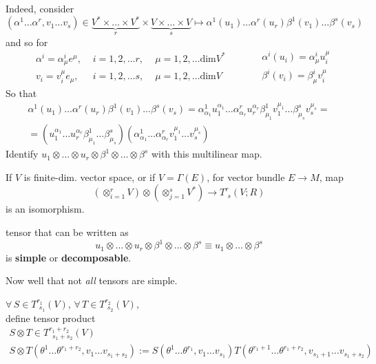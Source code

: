 Indeed, consider 
\[
(\alpha^1 \dots \alpha^r, v_1 \dots v_s) \in \underbrace{V^* \times \dots \times V^* }_{r} \times \underbrace{ V\times \dots \times V}_{s} \mapsto \alpha^1(u_1) \dots \alpha^r(u_r) \beta^1(v_1) \dots \beta^s(v_s)
\]
and so for 
\[
\begin{aligned}
	& \alpha^i = \alpha^i_{\mu} e^{\mu} , \, & \, i =1,2, \dots r, \, & \, \mu = 1,2, \dots \text{dim}V^* \\ 
	& v_i = v_i^{\mu} e_{\mu} , \, & \, i = 1,2, \dots s, \, & \, \mu = 1, 2, \dots \text{dim}V 
\end{aligned} \qquad \, \begin{aligned}
& \alpha^i(u_i) = \alpha^i_{\mu} u^{\mu}_i \\ 
 & \beta^i(v_i) = \beta^i_{\mu} v^{\mu}_i
\end{aligned}
\]
So that 
\[
\begin{gathered}
	\alpha^1(u_1) \dots \alpha^r(u_r) \beta^1(v_1) \dots \beta^s(v_s) = \alpha^1_{\alpha_1}u^{\alpha_1}_1 \dots \alpha^r_{\alpha_r} u^{\alpha_r}_r \beta^1_{\mu_1} v^{\mu_1}_1 \dots \beta^s_{\mu_s} v^{\mu_s}_s = \\
	= (u^{\alpha_1}_1 \dots u_r^{\alpha_r} \beta^1_{\mu_1} \dots \beta^s_{\mu_s})(\alpha^1_{\alpha_1} \dots \alpha^r_{\alpha_r} v_1^{\mu_1} \dots v_s^{\mu_s} )
\end{gathered}
\]
Identify $u_1 \otimes \dots \otimes u_r \otimes \beta^1 \otimes \dots \otimes \beta^s$ with this multilinear map.  

\begin{proposition}
If $V$ is finite-dim. vector space, or if $V=\Gamma(E)$, for vector bundle $E\to M$, map
\begin{equation}
\left( \otimes_{i=1}^r V \right)  \otimes \left( \otimes_{j=1}^s V^* \right) \to T^r_{ \, \, s}(V;R)
\end{equation}
is an isomorphism.  
\end{proposition}

\begin{definition}
tensor that can be written as 
\begin{equation}
u_1\otimes \dots \otimes u_r \otimes \beta^1 \otimes \dots \otimes \beta^s \equiv u_1\otimes \dots \otimes \beta^s 
\end{equation}
is \textbf{simple} or \textbf{decomposable}.  
\end{definition}
Now well that not \emph{all} tensors are simple.  

\begin{definition}
$\forall \, S\in T^{r_1}_{ \,\, s_1}(V)$, $\forall \, T \in T^{r_2}_{ \,\, s_2}(V)$, \\
define tensor product 
\begin{equation}
\begin{gathered}
S\otimes T\in T^{r_1+r_2}_{ \, \, \, s_1+s_2}(V) \\
	S\otimes T( \theta^1\dots \theta^{r_1 + r_2}, v_1 \dots v_{s_1+s_2}) := S(\theta^1\dots \theta^{r_1}, v_1\dots v_{s_1})T(\theta^{r_1+1}\dots \theta^{r_1+r_2}, v_{s_1+1}\dots v_{s_1 + s_2} )
\end{gathered}
\end{equation}
\end{definition}

